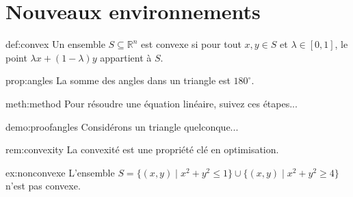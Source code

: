 
\section{Nouveaux environnements}

\begin{defn}{def:convex}
	Un ensemble \( S \subseteq \mathbb{R}^n \) est convexe si pour tout \( x, y \in S \) et \( \lambda \in [0, 1] \), le point \( \lambda x + (1-\lambda)y \) appartient à \( S \).
\end{defn}

\begin{prop}{prop:angles}
	La somme des angles dans un triangle est \(180^\circ\).
\end{prop}

\begin{meth}{meth:method}
	Pour résoudre une équation linéaire, suivez ces étapes...
\end{meth}

\begin{demo}{demo:proofangles}
	Considérons un triangle quelconque...
\end{demo}

\begin{rem}{rem:convexity}
	La convexité est une propriété clé en optimisation.
\end{rem}

\begin{exemple}{ex:nonconvexe}
	L'ensemble \( S = \{ (x,y) \mid x^2 + y^2 \leq 1 \} \cup \{(x,y) \mid x^2 + y^2 \geq 4 \} \) n'est pas convexe.
\end{exemple}
